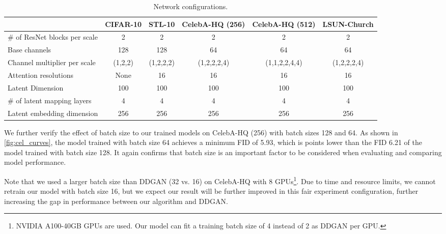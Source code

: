 \documentclass[10pt,twocolumn,letterpaper]{article}
\begin{document}
\begin{table*}[t]
\centering

\begin{tabular}{l|c|c|c|c|c}
\toprule
                                  & CIFAR-10 & STL-10    & CelebA-HQ (256) & CelebA-HQ (512) & LSUN-Church \\
\midrule
\# of ResNet blocks per scale     & 2        & 2         & 2               & 2               & 2           \\
Base channels                    & 128      & 128       & 64              & 64              & 64          \\
Channel multiplier per scale & (1,2,2)  & (1,2,2,2) & (1,2,2,2,4)     & (1,1,2,2,4,4)   & (1,2,2,2,4) \\
Attention resolutions              & None        & 16        & 16              & 16              & 16          \\
Latent Dimension                  & 100      & 100       & 100             & 100             & 100         \\
\# of latent mapping layers       & 4        & 4         & 4               & 4               & 4           \\
Latent embedding dimension        & 256      & 256       & 256             & 256             & 256    
     \\

\bottomrule
\end{tabular}

\caption{Network configurations. }
\label{tab:net_config}
\end{table*}

We further verify the effect of batch size to our trained models on CelebA-HQ (256) with batch sizes 128 and 64. As shown in \cref{fig:cel_curves}, the model trained with batch size 64 achieves a minimum FID of 5.93, which is  points lower than the FID 6.21 of the model trained with batch size 128. It again confirms that batch size is an important factor to be considered when evaluating and comparing model performance.

Note that we used a larger batch size than DDGAN (32 vs. 16) on CelebA-HQ  with 8 GPUs\footnote{NVIDIA A100-40GB GPUs are used. Our model can fit a training batch size of 4 instead of 2 as DDGAN per GPU.}. Due to time and resource limits, we cannot retrain our model with batch size 16, but we expect our result will be further improved in this fair experiment configuration, further increasing the gap in performance between our algorithm and DDGAN.
\end{document}
